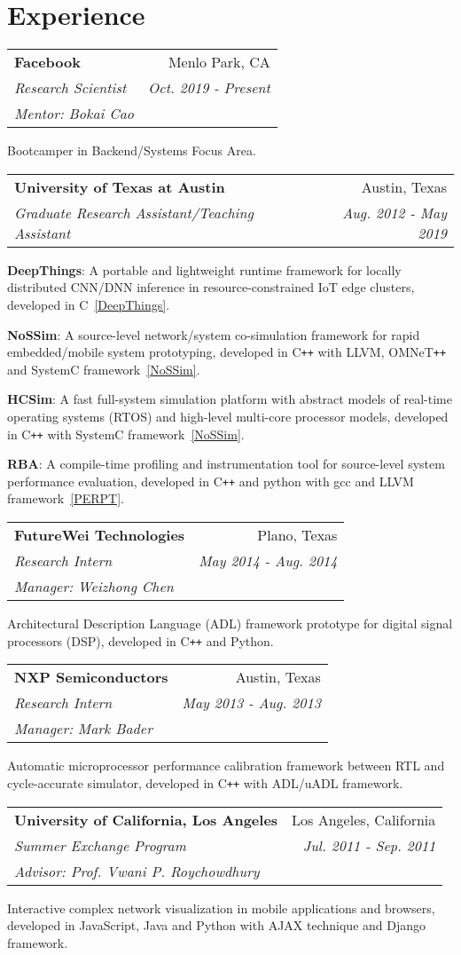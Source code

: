 \documentclass[letterpaper,11pt]{article}
\makeatletter
\def\plusplus{\texttt{++}\xspace}
\newcommand{\resumeItemList}[1]{
{\justifying
  \item{#1 \vspace{-6pt}}
\par}
}
\newcommand{\resumeItem}[2]{
{\justifying
  \item{
    \textbf{#1}{: #2 \vspace{-2pt}}
  }
\par}
}
\newcommand{\resumeSubheading}[4]{
  \vspace{-1pt}\item
    \begin{tabular*}{0.97\textwidth}[t]{l@{\extracolsep{\fill}}r}
      \textbf{#1} & #2 \\
      \textit{#3} & \textit{ #4} \\
    \end{tabular*}\vspace{-5pt}
}
\newcommand{\resumeSubheadingList}[5]{
  \vspace{-1pt}\item
    \begin{tabular*}{0.97\textwidth}[t]{l@{\extracolsep{\fill}}r}
      \textbf{#1} & #2 \\
      \textit{#3} & \textit{ #4} \\
      \textit{#5} &  \\
    \end{tabular*}\vspace{-5pt}
}
\newcommand{\resumeSubHeadingListStart}{\begin{itemize}[leftmargin=*]}
\newcommand{\resumeSubHeadingListEnd}{\end{itemize}}
\newcommand{\resumeItemListStart}{\begin{itemize}}
\newcommand{\resumeItemListEnd}{\end{itemize}\vspace{-5pt}}
\makeatother
\begin{document}
\section{Experience}
  \resumeSubHeadingListStart
    \resumeSubheadingList
      {Facebook}{Menlo Park, CA}
      {Research Scientist}{Oct. 2019 - Present}
      {Mentor: Bokai Cao}
      \resumeItemListStart
        \resumeItemList{Bootcamper in Backend/Systems Focus Area.}
      \resumeItemListEnd
  \resumeSubHeadingListEnd
\vspace{-5pt}
  \resumeSubHeadingListStart
    \resumeSubheading
      {University of Texas at Austin}{Austin, Texas}
      {Graduate Research Assistant/Teaching Assistant}{Aug. 2012 - May 2019}
      \resumeItemListStart
        \resumeItem{DeepThings}
          {A portable and lightweight runtime framework for locally distributed CNN/DNN inference in resource-constrained IoT edge clusters, developed in C~\ref{DeepThings}.}
        \resumeItem{NoSSim}
          {A source-level network/system co-simulation framework for rapid embedded/mobile system prototyping, developed in C\plusplus with LLVM, OMNeT\plusplus and SystemC framework~\ref{NoSSim}.}
        \resumeItem{HCSim}
          {A fast full-system simulation platform with abstract models of real-time operating systems (RTOS) and high-level multi-core processor models, developed in C\plusplus with SystemC framework~\ref{NoSSim}.}
        \resumeItem{RBA}
          {A compile-time profiling and instrumentation tool for source-level system performance evaluation, developed in C\plusplus and python with gcc and LLVM framework~\ref{PERPT}.}
      \resumeItemListEnd
  \resumeSubHeadingListEnd
\vspace{-5pt}
  \resumeSubHeadingListStart
    \resumeSubheadingList
      {FutureWei Technologies}{Plano, Texas}
      {Research Intern}{May 2014 - Aug. 2014}
      {Manager: Weizhong Chen}
      \resumeItemListStart
        \resumeItemList{Architectural Description Language (ADL) framework prototype for digital signal processors (DSP), developed in C\plusplus and Python.}
      \resumeItemListEnd
  \resumeSubHeadingListEnd
\vspace{-5pt}
  \resumeSubHeadingListStart
    \resumeSubheadingList
      {NXP Semiconductors}{Austin, Texas}
      {Research Intern}{May 2013 - Aug. 2013}
      {Manager: Mark Bader}
      \resumeItemListStart
        \resumeItemList{Automatic microprocessor performance calibration framework between RTL and cycle-accurate simulator, developed in C\plusplus with ADL/uADL framework.}
      \resumeItemListEnd
  \resumeSubHeadingListEnd
\vspace{-5pt}
  \resumeSubHeadingListStart
    \resumeSubheadingList
      {University of California, Los Angeles}{Los Angeles, California}
      {Summer Exchange Program}{Jul. 2011 - Sep. 2011}
      {Advisor: Prof. Vwani P. Roychowdhury}
      \resumeItemListStart
        \resumeItemList{Interactive complex network visualization in mobile applications and browsers, developed in JavaScript, Java and Python with AJAX technique and Django framework.}
      \resumeItemListEnd
  \resumeSubHeadingListEnd
\end{document}
